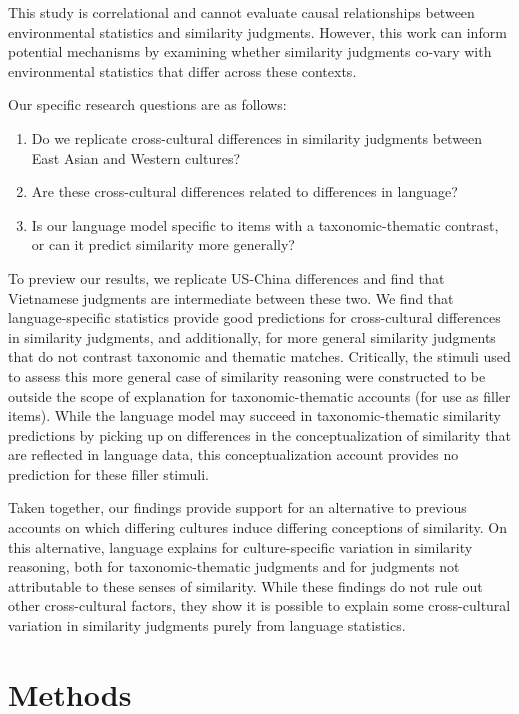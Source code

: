 \documentclass[10pt, letterpaper]{article}
\begin{document}
This study is correlational and cannot evaluate causal relationships
between environmental statistics and similarity judgments. However, this
work can inform potential mechanisms by examining whether similarity
judgments co-vary with environmental statistics that differ across these
contexts.

Our specific research questions are as follows:

\begin{enumerate}
\def\labelenumi{\arabic{enumi}.}
\item
  Do we replicate cross-cultural differences in similarity judgments
  between East Asian and Western cultures?
\item
  Are these cross-cultural differences related to differences in
  language?
\item
  Is our language model specific to items with a taxonomic-thematic
  contrast, or can it predict similarity more generally?
\end{enumerate}

To preview our results, we replicate US-China differences and find that
Vietnamese judgments are intermediate between these two. We find that
language-specific statistics provide good predictions for cross-cultural
differences in similarity judgments, and additionally, for more general
similarity judgments that do not contrast taxonomic and thematic
matches. Critically, the stimuli used to assess this more general case
of similarity reasoning were constructed to be outside the scope of
explanation for taxonomic-thematic accounts (for use as filler items).
While the language model may succeed in taxonomic-thematic similarity
predictions by picking up on differences in the conceptualization of
similarity that are reflected in language data, this conceptualization
account provides no prediction for these filler stimuli.

Taken together, our findings provide support for an alternative to
previous accounts on which differing cultures induce differing
conceptions of similarity. On this alternative, language explains for
culture-specific variation in similarity reasoning, both for
taxonomic-thematic judgments and for judgments not attributable to these
senses of similarity. While these findings do not rule out other
cross-cultural factors, they show it is possible to explain some
cross-cultural variation in similarity judgments purely from language
statistics.

\hypertarget{methods}{%
\section{Methods}\label{methods}}
\end{document}
